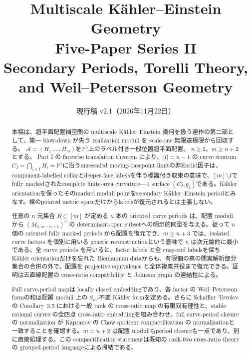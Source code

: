 \documentclass[11pt,a4paper]{ltjsarticle}
\title{\bfseries Multiscale K\"ahler--Einstein Geometry\\
Five-Paper Series II\\[2mm]
\large Secondary Periods, Torelli Theory,\\
and Weil--Petersson Geometry}
\author{}
\date{現行稿 v2.1（2026年11月22日）}
\newcommand{\PP}{\mathbb P}
\newcommand{\cA}{\mathcal A}
\theoremstyle{plain}
\theoremstyle{definition}
\theoremstyle{remark}
\begin{document}
\maketitle

\begin{abstract}
本稿は、超平面配置補空間の multiscale K\"ahler--Einstein 幾何を扱う連作の第二部として、第一 blow-down が失う realization moduli を scale-one 無限遠極限から回収する。
$\cA=(H_1,\ldots,H_m)$を$\PP^n$上のラベル付き一般位置超平面配置、
$n\ge2$、$m\ge n+2$とする。
Part I の facewise translation theorem により、$|I|=n-1$ の curve stratum
$C_I=\bigcap_{i\in I}H_i\simeq\PP^1$に沿うunrescaled moving-basepoint limitの非Euclid因子は、component-labelled collarとdeeper-face labelsを伴う標識付き収束の意味で、$[m]\setminus I$でfully markedされたcomplete finite-area curvature-$-1$ surface $(C_I^\circ,g_I)$である。K\"ahler orientationを保ったそのmarked moduli pointをsecondary K\"ahler--Einstein periodとみなす。裸のpointed metric spaceだけからlabelsが復元されるとは主張しない。

任意の $n$ 元集合 $B\subset[m]$ が定める $n$ 本の oriented curve periods は、配置 moduli から $(M_{0,m-n+1})^n$ の determinant-open subsetへの明示的同型を与える。従って $n$ 個の oriented fully marked periods から配置を復元でき、$m\ge n+3$ では、isolated curve factors を個別に用いる generic reconstructionという意味で $n$ は次元論的に最小である。全 curve periods を用いると、factor labels と全 cusp-end labelsを保ち K\"ahler orientationだけを忘れた Riemannian dataからも、有限個の真の閉実解析部分集合の合併の外で、配置を projective equivalence と全体複素共役まで復元できる。証明は五直線配置の cross-ratio compatibility と Johnson graph の連結性による。

Full curve-period mapは locally closed embeddingであり、各 factor の Weil--Petersson formの和は配置 moduli 上の $S_m$-不変 K\"ahler formを定める。さらに Schaffler--Tevelev の Corollary~3.5 における一般 rank の cross-ratio map の有限双有理性と、stable rational curves の全四点 cross-ratio embeddingを組み合わせ、full curve-period closure の normalization が Kapranov の Chow quotient compactification の normalizationと一致することを確認する。$m=n+2$ は配置 moduliもperiod closureも一点であり、別に直接処理する。この compactification statementは既知の rank-two cross-ratio theoryの grouped-period languageによる帰結である。


\end{abstract}
\end{document}
